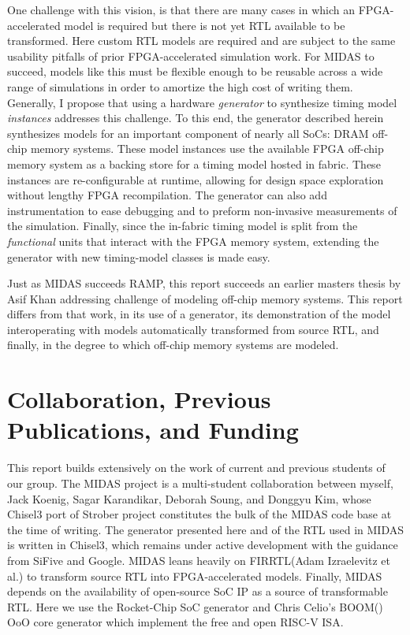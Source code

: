 One challenge with this vision, is that there are many cases in which an
FPGA-accelerated model is required but there is not yet RTL available to be
transformed. Here custom RTL models are required and are subject to the same
usability pitfalls of prior FPGA-accelerated simulation work. For MIDAS to
succeed, models like this must be flexible enough to be reusable across a wide
range of simulations in order to amortize the high cost of writing them.
Generally, I propose that using a hardware \emph{generator} to synthesize
timing model \emph{instances} addresses this challenge. To this end, the
generator described herein synthesizes models for an important component of
nearly all SoCs: DRAM off-chip memory systems. These model instances use the
available FPGA off-chip memory system as a backing store for a timing model
hosted in fabric. These instances are re-configurable at runtime, allowing for
design space exploration without lengthy FPGA recompilation. The generator can
also add instrumentation to ease debugging and to preform non-invasive
measurements of the simulation. Finally, since the in-fabric timing model is
split from the \emph{functional} units that interact with the FPGA memory
system, extending the generator with new timing-model classes is made easy.

Just as MIDAS succeeds RAMP, this report succeeds an earlier masters thesis by
Asif Khan\cite{khanmasters} addressing challenge of modeling off-chip memory
systems. This report differs from that work, in its use of a generator, its
demonstration of the model interoperating with models automatically transformed
from source RTL, and finally, in the degree to which off-chip memory systems
are modeled.

\section{Collaboration, Previous Publications, and Funding}

This report builds extensively on the work of current and previous students of
our group. The MIDAS project is a multi-student collaboration between myself,
Jack Koenig, Sagar Karandikar, Deborah Soung, and Donggyu Kim, whose Chisel3
port of Strober\cite{strober} project constitutes the bulk of the MIDAS code
base at the time of writing. The generator presented here and of the RTL used
in MIDAS is written in Chisel3\cite{chisel}, which remains under active
development with the guidance from SiFive and Google. MIDAS leans heavily on
FIRRTL\cite{firrtl}(Adam Izraelevitz et al.) to transform source RTL into
FPGA-accelerated models. Finally, MIDAS depends on the availability of
open-source SoC IP as a source of transformable RTL. Here we use the
Rocket-Chip\cite{rocketchip} SoC generator and Chris Celio's BOOM(\cite{boom})
OoO core generator which implement the free and open RISC-V ISA.

